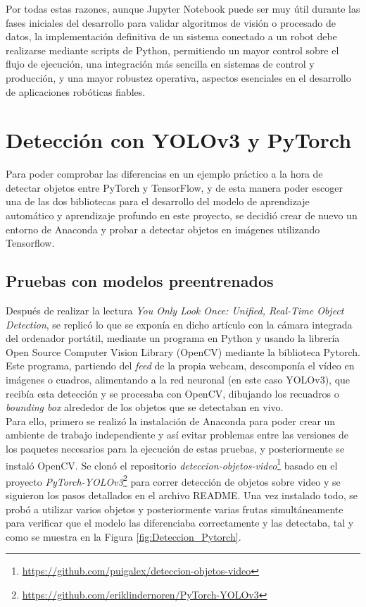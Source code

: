 Por todas estas razones, aunque Jupyter Notebook puede ser muy útil durante las fases iniciales del desarrollo para validar algoritmos de visión o procesado de datos, la implementación definitiva de un sistema conectado a un robot debe realizarse mediante scripts de Python, permitiendo un mayor control sobre el flujo de ejecución, una integración más sencilla en sistemas de control y producción, y una mayor robustez operativa, aspectos esenciales en el desarrollo de aplicaciones robóticas fiables.




\section{Detección con YOLOv3 y PyTorch}
\label{exp_seleccion_algoritmo}

Para poder comprobar las diferencias en un ejemplo práctico a la hora de detectar objetos entre PyTorch y TensorFlow, y de esta manera poder escoger una de las dos bibliotecas para el desarrollo del modelo de aprendizaje automático y aprendizaje profundo en este proyecto, se decidió crear de nuevo un entorno de Anaconda y probar a detectar objetos en imágenes utilizando Tensorflow.

\subsection{Pruebas con modelos preentrenados}
\label{sec:Pruebas_modelo_preentrenado_Pytorch}

Después de realizar la lectura \textit{You Only Look Once: Unified, Real-Time Object Detection}\cite{Redmon16}, se replicó lo que se exponía en dicho artículo con la cámara integrada del ordenador portátil, mediante un programa en Python y usando la librería Open Source Computer Vision Library (OpenCV) mediante la biblioteca Pytorch. Este programa, partiendo del \textit{feed} de la propia webcam, descomponía el vídeo en imágenes o cuadros, alimentando a la red neuronal (en este caso YOLOv3), que recibía esta detección y se procesaba con OpenCV, dibujando los recuadros o \textit{bounding box} alrededor de los objetos que se detectaban en vivo.\\

Para ello, primero se realizó la instalación de Anaconda para poder crear un ambiente de trabajo independiente y así evitar problemas entre las versiones de los paquetes necesarios para la ejecución de estas pruebas, y posteriormente se instaló OpenCV. Se clonó el repositorio \textit{deteccion-objetos-video}\footnote{\url{https://github.com/puigalex/deteccion-objetos-video}} basado en el proyecto \textit{PyTorch-YOLOv3}\footnote{\url{https://github.com/eriklindernoren/PyTorch-YOLOv3}} para correr detección de objetos sobre video y se siguieron los pasos detallados en el archivo README.
Una vez instalado todo, se probó a utilizar varios objetos y posteriormente varias frutas simultáneamente para verificar que el modelo las diferenciaba correctamente y las detectaba, tal y como se muestra en la Figura \ref{fig:Deteccion_Pytorch}.


